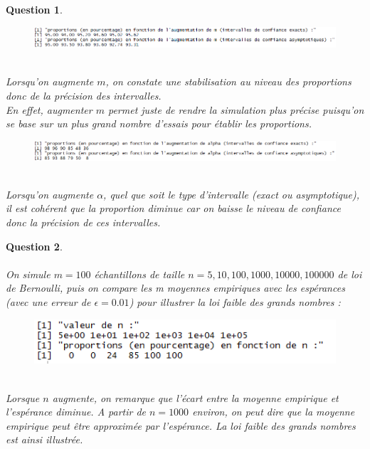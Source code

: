 \documentclass[a4paper,11pt]{article}
\newtheorem{exo4}{Question}
\begin{document}
\begin{exo4}
\newpage
\begin{figure}[h]
\includegraphics[scale=0.85]{images/Q4_1_m.PNG}
\end{figure} \ \\
Lorsqu'on augmente $m$, on constate une stabilisation au niveau des proportions donc de la précision des intervalles. \ \\
En effet, augmenter $m$ permet juste de rendre la simulation plus précise puisqu'on se base sur un plus grand nombre d'essais pour établir les proportions.
\begin{figure}[h]
\includegraphics[scale=0.85]{images/Q4_1_alpha.PNG}
\end{figure} \ \\
Lorsqu'on augmente $\alpha$, quel que soit le type d'intervalle (exact ou asymptotique), il est cohérent que la proportion diminue car on baisse le niveau de confiance donc la précision de ces intervalles. \ \\
\end{exo4}

\begin{exo4} \ \\ \\
On simule $m=100$ échantillons de taille $n=5,10,100,1000,10000,100000$ de loi de Bernoulli, puis on compare les m moyennes empiriques avec les espérances (avec une erreur de $\epsilon=0.01$) pour illustrer la loi faible des grands nombres :
\begin{figure}[h]
\includegraphics[scale=1.2]{images/Q4_2.PNG}
\end{figure} \ \\
Lorsque $n$ augmente, on remarque que l'écart entre la moyenne empirique et l'espérance diminue. A partir de $n=1000$ environ, on peut dire que la moyenne empirique peut être approximée par l'espérance. La loi faible des grands nombres est ainsi illustrée.
\end{exo4}
\end{document}
